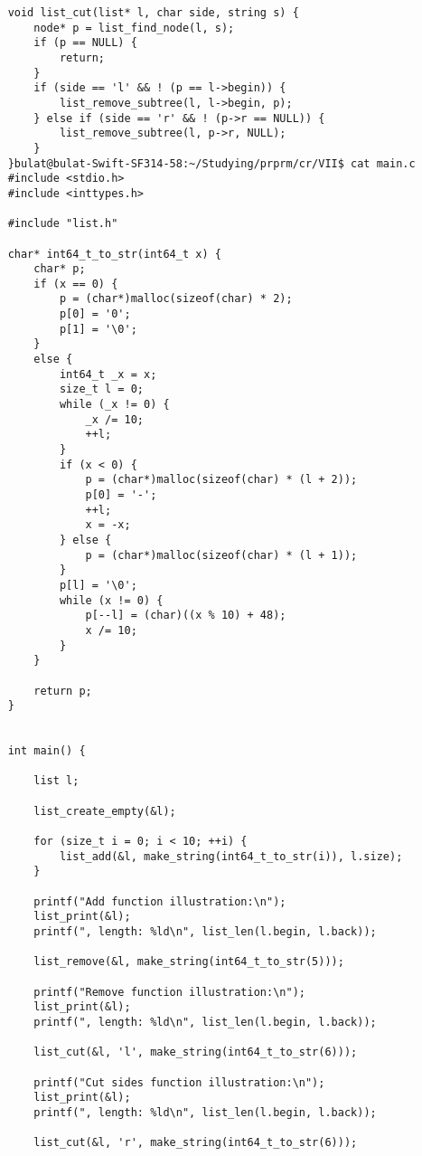 \documentclass[a4paper]{article}
\newcounter{i}
\begin{document}
\begin{enumerate}[label=\textbf{\arabic*}.]
\begin{verbatim}
    void list_cut(list* l, char side, string s) {
        node* p = list_find_node(l, s);
        if (p == NULL) {
            return;
        }
        if (side == 'l' && ! (p == l->begin)) {
            list_remove_subtree(l, l->begin, p);
        } else if (side == 'r' && ! (p->r == NULL)) {
            list_remove_subtree(l, p->r, NULL);
        }
    }bulat@bulat-Swift-SF314-58:~/Studying/prprm/cr/VII$ cat main.c 
    #include <stdio.h>
    #include <inttypes.h>
    
    #include "list.h"
    
    char* int64_t_to_str(int64_t x) {
        char* p;
        if (x == 0) {
            p = (char*)malloc(sizeof(char) * 2);
            p[0] = '0';
            p[1] = '\0';
        }
        else {
            int64_t _x = x;
            size_t l = 0;
            while (_x != 0) {
                _x /= 10;
                ++l;
            }
            if (x < 0) {
                p = (char*)malloc(sizeof(char) * (l + 2));
                p[0] = '-';
                ++l;
                x = -x;
            } else {
                p = (char*)malloc(sizeof(char) * (l + 1));
            }
            p[l] = '\0';
            while (x != 0) {
                p[--l] = (char)((x % 10) + 48);
                x /= 10;
            }
        }
        
        return p;
    }
    
    
    int main() {
    
        list l;
        
        list_create_empty(&l);
    
        for (size_t i = 0; i < 10; ++i) {
            list_add(&l, make_string(int64_t_to_str(i)), l.size);
        }
    
        printf("Add function illustration:\n");
        list_print(&l);
        printf(", length: %ld\n", list_len(l.begin, l.back));
    
        list_remove(&l, make_string(int64_t_to_str(5)));
    
        printf("Remove function illustration:\n");
        list_print(&l);
        printf(", length: %ld\n", list_len(l.begin, l.back));
    
        list_cut(&l, 'l', make_string(int64_t_to_str(6)));
    
        printf("Cut sides function illustration:\n");
        list_print(&l);
        printf(", length: %ld\n", list_len(l.begin, l.back));
    
        list_cut(&l, 'r', make_string(int64_t_to_str(6)));
    

\end{verbatim}
\end{enumerate}
\end{document}
